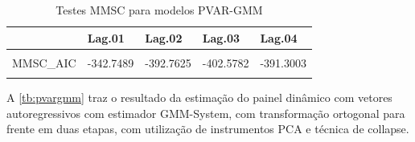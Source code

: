 \documentclass[
  12pt,
  12pt,
  openright,
  oneside,
  a4paper,
  chapter=TITLE,
  section=TITLE,
  subsection=TITLE,
  subsubsection=TITLE,
  portugues,
  sumario=tradicional]{abntex2}
\begin{document}
\begin{table}[!hbtp]
\caption{Testes MMSC para modelos PVAR-GMM}
\vspace{-1mm}
\begingroup\fontsize{10}{12}\selectfont

\begin{tabu} to 
\toprule
  & Lag.01 & Lag.02 & Lag.03 & Lag.04\\
\midrule
{} &  &  &  & \\
MMSC\_AIC & -342.7489 & -392.7625 & -402.5782 & -391.3003\\
 &  &  &  & \\
\bottomrule
\end{tabu}
\endgroup{}
\vspace{1mm}
\label{tb:mmsc}
\vspace{-2mm}
\end{table}

A \autoref{tb:pvargmm} traz o resultado da estimação do painel dinâmico com vetores autoregressivos com estimador GMM-System, com transformação ortogonal para frente em duas etapas, com utilização de instrumentos PCA e técnica de collapse.

\vspace{20pt}
\vspace{-1mm}
\end{document}
